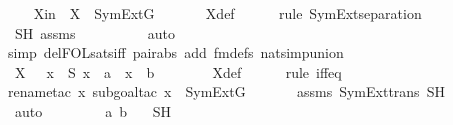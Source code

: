 \begin{isabellebody}
\ \ \isamarkupfalse%
\ Xin\ {\isacharcolon}{\kern0pt}\ {\isachardoublequoteopen}X\ {\isasymin}\ SymExt{\isacharparenleft}{\kern0pt}G{\isacharparenright}{\kern0pt}{\isachardoublequoteclose}\ \isanewline
\ \ \ \ \isamarkupfalse%
\ X{\isacharunderscore}{\kern0pt}def\ \isanewline
\ \ \ \ \isamarkupfalse%
{\isacharparenleft}{\kern0pt}rule\ SymExt{\isacharunderscore}{\kern0pt}separation{\isacharparenright}{\kern0pt}\isanewline
\ \ \ \ \isamarkupfalse%
\ SH\ assms\ \isanewline
\ \ \ \ \ \ \ \isamarkupfalse%
\ auto{\isacharbrackleft}{\kern0pt}{}{\isacharbrackright}{\kern0pt}\isanewline
\ \ \ \ \isamarkupfalse%
{\isacharparenleft}{\kern0pt}simp\ del{\isacharcolon}{\kern0pt}FOL{\isacharunderscore}{\kern0pt}sats{\isacharunderscore}{\kern0pt}iff\ pair{\isacharunderscore}{\kern0pt}abs\ add{\isacharcolon}{\kern0pt}\ fm{\isacharunderscore}{\kern0pt}defs\ nat{\isacharunderscore}{\kern0pt}simp{\isacharunderscore}{\kern0pt}union{\isacharparenright}{\kern0pt}\ \isanewline
\ \ \ \ \isamarkupfalse%
\isanewline
\ \ \isamarkupfalse%
\ {\isachardoublequoteopen}X\ {\isacharequal}{\kern0pt}\ {\isacharbraceleft}{\kern0pt}\ x\ {\isasymin}\ S{\isachardot}{\kern0pt}\ x\ {\isacharequal}{\kern0pt}\ a\ {\isasymor}\ x\ {\isacharequal}{\kern0pt}\ b\ {\isacharbraceright}{\kern0pt}{\isachardoublequoteclose}\ \isanewline
\ \ \ \ \isamarkupfalse%
\ X{\isacharunderscore}{\kern0pt}def\ \isanewline
\ \ \ \ \isamarkupfalse%
{\isacharparenleft}{\kern0pt}rule\ iff{\isacharunderscore}{\kern0pt}eq{\isacharparenright}{\kern0pt}\isanewline
\ \ \ \ \isamarkupfalse%
{\isacharparenleft}{\kern0pt}rename{\isacharunderscore}{\kern0pt}tac\ x{\isacharcomma}{\kern0pt}\ subgoal{\isacharunderscore}{\kern0pt}tac\ {\isachardoublequoteopen}x\ {\isasymin}\ SymExt{\isacharparenleft}{\kern0pt}G{\isacharparenright}{\kern0pt}{\isachardoublequoteclose}{\isacharparenright}{\kern0pt}\ \isanewline
\ \ \ \ \isamarkupfalse%
\ assms\ SymExt{\isacharunderscore}{\kern0pt}trans\ SH\isanewline
\ \ \ \ \isamarkupfalse%
\ auto\isanewline
\ \ \isamarkupfalse%
\ \isamarkupfalse%
\ {\isachardoublequoteopen}{\isachardot}{\kern0pt}{\isachardot}{\kern0pt}{\isachardot}{\kern0pt}\ {\isacharequal}{\kern0pt}\ {\isacharbraceleft}{\kern0pt}\ a{\isacharcomma}{\kern0pt}\ b\ {\isacharbraceright}{\kern0pt}{\isachardoublequoteclose}\ \isamarkupfalse%
\ SH\ \isamarkupfalse%

\end{isabellebody}
